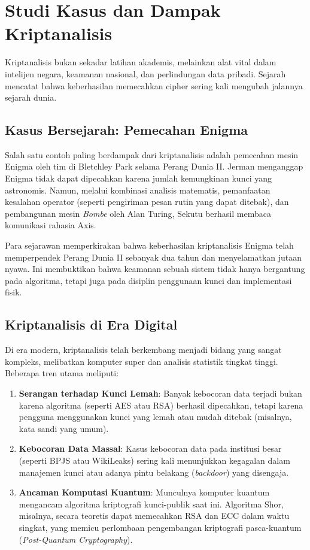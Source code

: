 ﻿\section{Studi Kasus dan Dampak Kriptanalisis}

Kriptanalisis bukan sekadar latihan akademis, melainkan alat vital dalam intelijen negara, keamanan nasional, dan perlindungan data pribadi. Sejarah mencatat bahwa keberhasilan memecahkan cipher sering kali mengubah jalannya sejarah dunia.

\subsection{Kasus Bersejarah: Pemecahan Enigma}

Salah satu contoh paling berdampak dari kriptanalisis adalah pemecahan mesin Enigma oleh tim di Bletchley Park selama Perang Dunia II. Jerman menganggap Enigma tidak dapat dipecahkan karena jumlah kemungkinan kunci yang astronomis. Namun, melalui kombinasi analisis matematis, pemanfaatan kesalahan operator (seperti pengiriman pesan rutin yang dapat ditebak), dan pembangunan mesin \textit{Bombe} oleh Alan Turing, Sekutu berhasil membaca komunikasi rahasia Axis.

Para sejarawan memperkirakan bahwa keberhasilan kriptanalisis Enigma telah memperpendek Perang Dunia II sebanyak dua tahun dan menyelamatkan jutaan nyawa. Ini membuktikan bahwa keamanan sebuah sistem tidak hanya bergantung pada algoritma, tetapi juga pada disiplin penggunaan kunci dan implementasi fisik.

\subsection{Kriptanalisis di Era Digital}

Di era modern, kriptanalisis telah berkembang menjadi bidang yang sangat kompleks, melibatkan komputer super dan analisis statistik tingkat tinggi. Beberapa tren utama meliputi:

\begin{enumerate}
    \item \textbf{Serangan terhadap Kunci Lemah}: Banyak kebocoran data terjadi bukan karena algoritma (seperti AES atau RSA) berhasil dipecahkan, tetapi karena pengguna menggunakan kunci yang lemah atau mudah ditebak (misalnya, kata sandi yang umum).
    \item \textbf{Kebocoran Data Massal}: Kasus kebocoran data pada institusi besar (seperti BPJS atau WikiLeaks) sering kali menunjukkan kegagalan dalam manajemen kunci atau adanya pintu belakang (\textit{backdoor}) yang disengaja.
    \item \textbf{Ancaman Komputasi Kuantum}: Munculnya komputer kuantum mengancam algoritma kriptografi kunci-publik saat ini. Algoritma Shor, misalnya, secara teoretis dapat memecahkan RSA dan ECC dalam waktu singkat, yang memicu perlombaan pengembangan kriptografi pasca-kuantum (\textit{Post-Quantum Cryptography}).
\end{enumerate}

